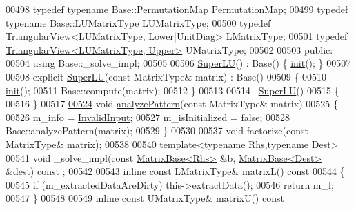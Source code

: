 \begin{DoxyCode}
00498     \textcolor{keyword}{typedef} \textcolor{keyword}{typename} Base::PermutationMap PermutationMap;
00499     \textcolor{keyword}{typedef} \textcolor{keyword}{typename} Base::LUMatrixType LUMatrixType;
00500     \textcolor{keyword}{typedef} \hyperlink{group___core___module_class_eigen_1_1_triangular_view}{TriangularView<LUMatrixType, Lower|UnitDiag>}  
      LMatrixType;
00501     \textcolor{keyword}{typedef} \hyperlink{group___core___module_class_eigen_1_1_triangular_view}{TriangularView<LUMatrixType,  Upper>}          UMatrixType;
00502 
00503   \textcolor{keyword}{public}:
00504     \textcolor{keyword}{using} Base::\_solve\_impl;
00505 
00506     \hyperlink{class_eigen_1_1_super_l_u}{SuperLU}() : Base() \{ \hyperlink{structinit}{init}(); \}
00507 
00508     \textcolor{keyword}{explicit} \hyperlink{class_eigen_1_1_super_l_u}{SuperLU}(\textcolor{keyword}{const} MatrixType& matrix) : Base()
00509     \{
00510       \hyperlink{structinit}{init}();
00511       Base::compute(matrix);
00512     \}
00513 
00514     ~\hyperlink{class_eigen_1_1_super_l_u}{SuperLU}()
00515     \{
00516     \}
00517     
\hyperlink{class_eigen_1_1_super_l_u_a493cdfada27415a6037b004ff974eace}{00524}     \textcolor{keywordtype}{void} \hyperlink{class_eigen_1_1_super_l_u_a493cdfada27415a6037b004ff974eace}{analyzePattern}(\textcolor{keyword}{const} MatrixType& matrix)
00525     \{
00526       m\_info = \hyperlink{group__enums_gga85fad7b87587764e5cf6b513a9e0ee5ea945604f62795ffc70aedf2bd12ea0434}{InvalidInput};
00527       m\_isInitialized = \textcolor{keyword}{false};
00528       Base::analyzePattern(matrix);
00529     \}
00530     
00537     \textcolor{keywordtype}{void} factorize(\textcolor{keyword}{const} MatrixType& matrix);
00538     
00540     \textcolor{keyword}{template}<\textcolor{keyword}{typename} Rhs,\textcolor{keyword}{typename} Dest>
00541     \textcolor{keywordtype}{void} \_solve\_impl(\textcolor{keyword}{const} \hyperlink{group___core___module_class_eigen_1_1_matrix_base}{MatrixBase<Rhs>} &b, \hyperlink{group___core___module_class_eigen_1_1_matrix_base}{MatrixBase<Dest>} &dest) \textcolor{keyword}{const}
      ;
00542     
00543     \textcolor{keyword}{inline} \textcolor{keyword}{const} LMatrixType& matrixL()\textcolor{keyword}{ const}
00544 \textcolor{keyword}{    }\{
00545       \textcolor{keywordflow}{if} (m\_extractedDataAreDirty) this->extractData();
00546       \textcolor{keywordflow}{return} m\_l;
00547     \}
00548 
00549     \textcolor{keyword}{inline} \textcolor{keyword}{const} UMatrixType& matrixU()\textcolor{keyword}{ const}

\end{DoxyCode}
